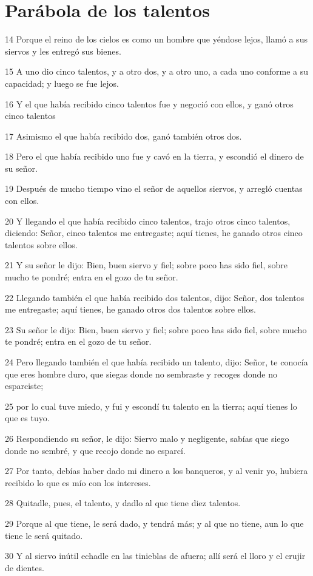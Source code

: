 \section*{Parábola de los talentos}

\par 14 Porque el reino de los cielos es como un hombre que yéndose lejos, llamó a sus siervos y les entregó sus bienes.
\par 15 A uno dio cinco talentos, y a otro dos, y a otro uno, a cada uno conforme a su capacidad; y luego se fue lejos.
\par 16 Y el que había recibido cinco talentos fue y negoció con ellos, y ganó otros cinco talentos
\par 17 Asimismo el que había recibido dos, ganó también otros dos.
\par 18 Pero el que había recibido uno fue y cavó en la tierra, y escondió el dinero de su señor.
\par 19 Después de mucho tiempo vino el señor de aquellos siervos, y arregló cuentas con ellos.
\par 20 Y llegando el que había recibido cinco talentos, trajo otros cinco talentos, diciendo: Señor, cinco talentos me entregaste; aquí tienes, he ganado otros cinco talentos sobre ellos.
\par 21 Y su señor le dijo: Bien, buen siervo y fiel; sobre poco has sido fiel, sobre mucho te pondré; entra en el gozo de tu señor.
\par 22 Llegando también el que había recibido dos talentos, dijo: Señor, dos talentos me entregaste; aquí tienes, he ganado otros dos talentos sobre ellos.
\par 23 Su señor le dijo: Bien, buen siervo y fiel; sobre poco has sido fiel, sobre mucho te pondré; entra en el gozo de tu señor.
\par 24 Pero llegando también el que había recibido un talento, dijo: Señor, te conocía que eres hombre duro, que siegas donde no sembraste y recoges donde no esparciste;
\par 25 por lo cual tuve miedo, y fui y escondí tu talento en la tierra; aquí tienes lo que es tuyo.
\par 26 Respondiendo su señor, le dijo: Siervo malo y negligente, sabías que siego donde no sembré, y que recojo donde no esparcí.
\par 27 Por tanto, debías haber dado mi dinero a los banqueros, y al venir yo, hubiera recibido lo que es mío con los intereses.
\par 28 Quitadle, pues, el talento, y dadlo al que tiene diez talentos.
\par 29 Porque al que tiene, le será dado, y tendrá más; y al que no tiene, aun lo que tiene le será quitado.
\par 30 Y al siervo inútil echadle en las tinieblas de afuera; allí será el lloro y el crujir de dientes.

